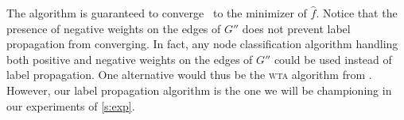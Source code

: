 The algorithm is guaranteed to converge~\autocite{LabelPropa03} to the minimizer of ${\widehat f}$.
Notice that the presence of negative weights on the edges of $G''$ does not prevent label
propagation from converging. In fact, any node classification algorithm handling both positive and
negative weights on the edges of $G''$ could be used instead of label propagation. One alternative
would thus be the \textsc{wta} algorithm from \autocite{WTA13}. However, our label propagation
algorithm is the one we will be championing in our experiments of \autoref{s:exp}.
